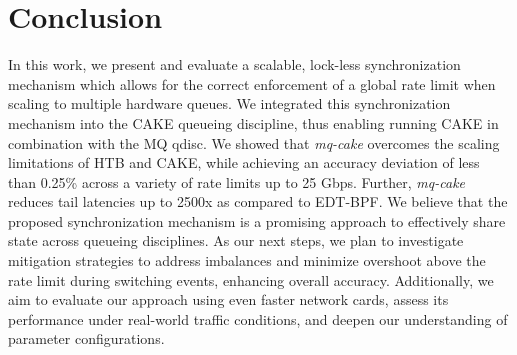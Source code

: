 \section{Conclusion}
In this work, we present and evaluate a scalable, lock-less synchronization mechanism which allows for the correct enforcement of a global rate limit when scaling to multiple hardware queues.
We integrated this synchronization mechanism into the CAKE queueing discipline, thus enabling running CAKE in combination with the MQ qdisc.
We showed that \textit{mq-cake} overcomes the scaling limitations of HTB and CAKE, while achieving an accuracy deviation of less than 0.25\% across a variety of rate limits up to 25 Gbps.
Further, \textit{mq-cake} reduces tail latencies up to 2500x as compared to EDT-BPF.
We believe that the proposed synchronization mechanism is a promising approach to effectively share state across queueing disciplines.
As our next steps, we plan to investigate mitigation strategies to address imbalances and minimize overshoot above the rate limit during switching events, enhancing overall accuracy. Additionally, we aim to evaluate our approach using even faster network cards, assess its performance under real-world traffic conditions, and deepen our understanding of parameter configurations.

